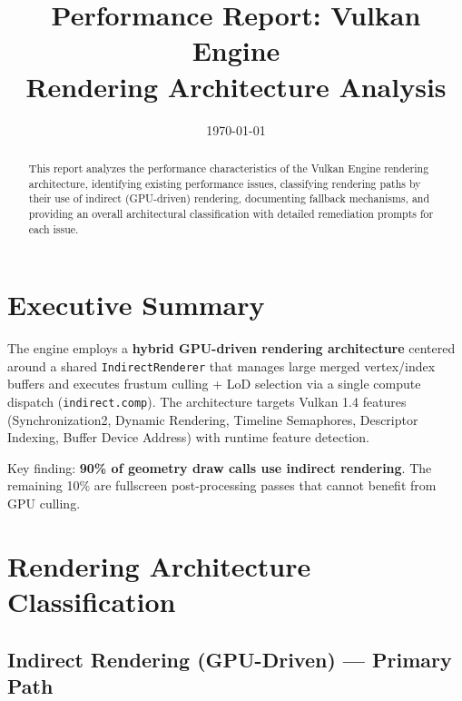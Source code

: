 \documentclass[11pt,a4paper]{article}
\title{Performance Report: Vulkan Engine \\
\large Rendering Architecture Analysis}
\author{}
\date{\today}
\begin{document}
\maketitle

\begin{abstract}
This report analyzes the performance characteristics of the Vulkan Engine rendering architecture, identifying existing performance issues, classifying rendering paths by their use of indirect (GPU-driven) rendering, documenting fallback mechanisms, and providing an overall architectural classification with detailed remediation prompts for each issue.
\end{abstract}

\tableofcontents
\newpage

\section{Executive Summary}

The engine employs a \textbf{hybrid GPU-driven rendering architecture} centered around a shared \texttt{IndirectRenderer} that manages large merged vertex/index buffers and executes frustum culling + LoD selection via a single compute dispatch (\texttt{indirect.comp}). The architecture targets Vulkan 1.4 features (Synchronization2, Dynamic Rendering, Timeline Semaphores, Descriptor Indexing, Buffer Device Address) with runtime feature detection.

Key finding: \textbf{90\% of geometry draw calls use indirect rendering}. The remaining 10\% are fullscreen post-processing passes that cannot benefit from GPU culling.

\section{Rendering Architecture Classification}

\subsection{Indirect Rendering (GPU-Driven) — Primary Path}
\end{document}
